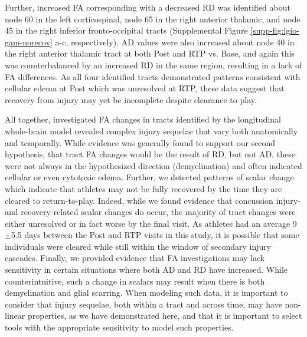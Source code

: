 \documentclass[12pt]{article}
\begin{document}
Further, increased FA corresponding with a decreased RD was identified about node 60 in the left corticospinal, node 65 in the right anterior thalamic, and node 45 in the right inferior fronto-occipital tracts (Supplemental Figure \ref{supp-fig:lgio-gam-norecov} a-c, respectively). AD values were also increased about node 40 in the right anterior thalamic tract at both Post and RTP vs. Base, and again this was counterbalanced by an increased RD in the same region, resulting in a lack of FA differences. As all four identified tracts demonstrated patterns consistent with cellular edema at Post which was unresolved at RTP, these data suggest that recovery from injury may yet be incomplete despite clearance to play.

All together, investigated FA changes in tracts identified by the longitudinal whole-brain model revealed complex injury sequelae that vary both anatomically and temporally. While evidence was generally found to support our second hypothesis, that tract FA changes would be the result of RD, but not AD, these were not always in the hypothesized direction (demyelination) and often indicated cellular or even cytotoxic edema. Further, we detected patterns of scalar change which indicate that athletes may not be fully recovered by the time they are cleared to return-to-play. Indeed, while we found evidence that concussion injury- and recovery-related scalar changes do occur, the majority of tract changes were either unresolved or in fact worse by the final visit. As athletes had an average 9$\pm$5.5 days between the Post and RTP visits in this study, it is possible that some individuals were cleared while still within the window of secondary injury cascades. Finally, we provided evidence that FA investigations may lack sensitivity in certain situations where both AD and RD have increased. While counterintuitive, such a change in scalars may result when there is both demyelination and glial scarring. When modeling such data, it is important to consider that injury sequelae, both within a tract and across time, may have non-linear properties, as we have demonstrated here, and that it is important to select tools with the appropriate sensitivity to model such properties.
\end{document}
